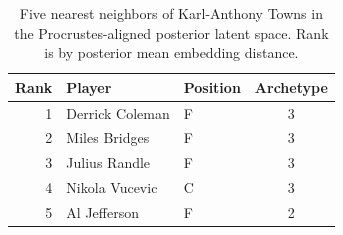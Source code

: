 \begin{table}[htbp]
  \centering\small
  \begin{tabular}{rllc}
    \toprule
    Rank & Player & Position & Archetype \\
    \midrule
    1 & Derrick Coleman & F & 3 \\
    2 & Miles Bridges & F & 3 \\
    3 & Julius Randle & F & 3 \\
    4 & Nikola Vucevic & C & 3 \\
    5 & Al Jefferson & F & 2 \\
    \bottomrule
  \end{tabular}
  \caption{Five nearest neighbors of Karl-Anthony Towns in the Procrustes-aligned posterior latent space. Rank is by posterior mean embedding distance.}
  \label{tab:Karl_Anthony_Towns_neighbors}
\end{table}

